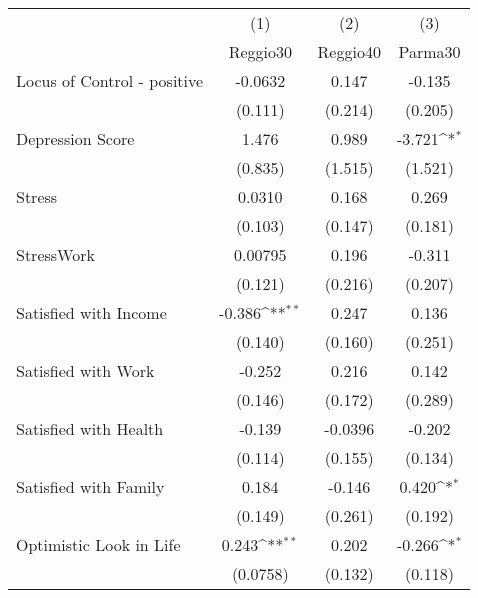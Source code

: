 {
\def\sym#1{\ifmmode^{#1}\else\(^{#1}\)\fi}
\begin{tabular}{l*{3}{c}}
\hline\hline
            &\multicolumn{1}{c}{(1)}&\multicolumn{1}{c}{(2)}&\multicolumn{1}{c}{(3)}\\
            &\multicolumn{1}{c}{Reggio30}&\multicolumn{1}{c}{Reggio40}&\multicolumn{1}{c}{Parma30}\\
\hline
Locus of Control - positive&     -0.0632         &       0.147         &      -0.135         \\
            &     (0.111)         &     (0.214)         &     (0.205)         \\
[1em]
Depression Score&       1.476         &       0.989         &      -3.721\sym{*}  \\
            &     (0.835)         &     (1.515)         &     (1.521)         \\
[1em]
Stress      &      0.0310         &       0.168         &       0.269         \\
            &     (0.103)         &     (0.147)         &     (0.181)         \\
[1em]
StressWork  &     0.00795         &       0.196         &      -0.311         \\
            &     (0.121)         &     (0.216)         &     (0.207)         \\
[1em]
Satisfied with Income&      -0.386\sym{**} &       0.247         &       0.136         \\
            &     (0.140)         &     (0.160)         &     (0.251)         \\
[1em]
Satisfied with Work&      -0.252         &       0.216         &       0.142         \\
            &     (0.146)         &     (0.172)         &     (0.289)         \\
[1em]
Satisfied with Health&      -0.139         &     -0.0396         &      -0.202         \\
            &     (0.114)         &     (0.155)         &     (0.134)         \\
[1em]
Satisfied with Family&       0.184         &      -0.146         &       0.420\sym{*}  \\
            &     (0.149)         &     (0.261)         &     (0.192)         \\
[1em]
Optimistic Look in Life&       0.243\sym{**} &       0.202         &      -0.266\sym{*}  \\
            &    (0.0758)         &     (0.132)         &     (0.118)         \\

\end{tabular}}
